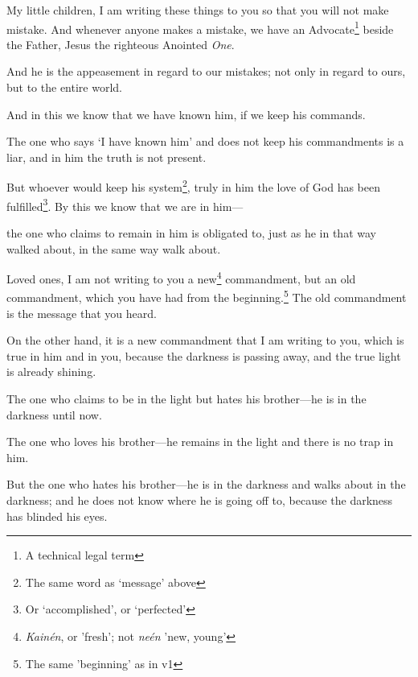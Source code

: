 \documentclass[article]{memoir}%
\newcounter{vnum}
\renewcommand*{\chapter}{
	\vspace{\baselineskip}
	\settowidth{\chapindent}{\chapnumfont 999}
	\noindent\llap{\makebox[\chapindent][l]{%
		\chapnumfont \thechapter}}%
	\addtocounter{chapter}{1}
	\setcounter{vnum}{1}
}
\newcommand{\vnum}{%
	\textsuperscript{\thevnum}%
	\addtocounter{vnum}{1}%
}
\newcommand{\infer}[1]{\textit{#1}}
\newcommand{\focus}[1]{{#1}}
\newcommand{\lx}[1]{\textit{#1}}
\begin{document}
\chapter{} \vnum My little children, I am writing these things to you so that you will not make mistake. And whenever anyone makes a mistake, we have an Advocate\footnote{A technical legal term} beside the Father, Jesus the righteous Anointed \infer{One}. \vnum And he is the appeasement in regard to our mistakes; not only in regard to ours, but to the entire world. \vnum And in this we know that we have known him, if we keep his commands. \vnum The one who says `I have known him' and does not keep his commandments is a liar, and in him the truth is not present. \vnum But whoever would keep his system\footnote{The same word as `message' above}, truly in him the love of God	 has been fulfilled\footnote{Or `accomplished', or `perfected'}. By this we know that we \focus{are} in him---\vnum{}the one who claims to remain in him is obligated to, just as he in that way walked about, in the same way walk about.

\vnum Loved ones, I am not writing to you a new\footnote{\lx{Kainén}, or 'fresh'; not \textit{neén} 'new, young'} commandment, but an old commandment, which you have had from the beginning.\footnote{The same 'beginning' as in v1} The old commandment is the message that you heard. \vnum On the other hand, it is a new commandment that I am writing to you, which is true in him and in you, because the darkness is passing away, and the true light is already shining. \vnum The one who claims to be in the light but hates his brother---he is in the darkness until now. \vnum The one who loves his brother---he remains in the light and there is no trap in him. \vnum But the one who hates his brother---he is in the darkness and walks about in the darkness; and he does not know where he is going off to, because the darkness has blinded his eyes.
\end{document}
